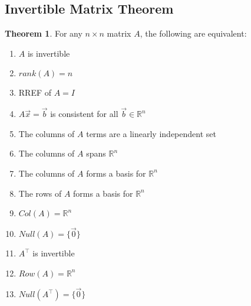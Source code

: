 \documentclass[12pt]{article}
\theoremstyle{definition}
\newtheorem*{theorem}{Theorem}
\begin{document}
\subsection{Invertible Matrix Theorem}
\begin{theorem}
  For any $n \times n$ matrix $A$, the following are equivalent:
  \begin{enumerate}
    \item $A$ is invertible
    \item $rank(A) = n$
    \item RREF of $A = I$
    \item $A\vec{x} = \vec{b}$ is consistent for all $\vec{b} \in \mathbb{R}^{n}$
    \item The columns of $A$ terms are a linearly independent set
    \item The columns of $A$ spans $\mathbb{R}^{n}$
    \item The columns of $A$ forms a basis for $\mathbb{R}^{n}$
    \item The rows of $A$ forms a basis for $\mathbb{R}^{n}$
    \item $Col(A) = \mathbb{R}^{n}$
    \item $Null(A) = \{\vec{0}\}$
    \item $A^{\intercal}$ is invertible
    \item $Row(A) = \mathbb{R}^{n}$
    \item $Null(A^{\intercal}) = \{\vec{0}\}$
  \end{enumerate}
\end{theorem}

\clearpage
\printindex
\end{document}
